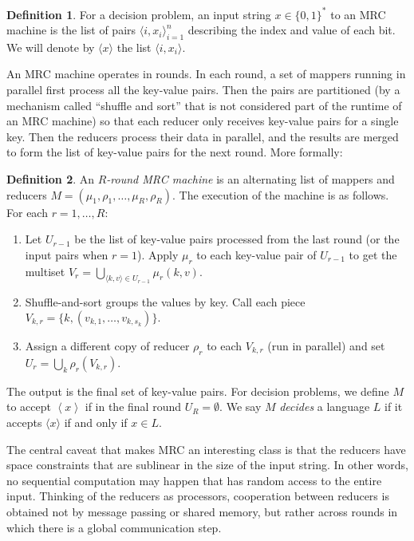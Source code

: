 \documentclass[11pt]{article}
\theoremstyle{definition}
\newtheorem{defn}{Definition}
\theoremstyle{remark}
\begin{document}
\begin{defn}
For a decision problem, an input string $x \in \{ 0,1 \}^*$ to an MRC machine
is the list of pairs $\langle i, x_i \rangle_{i=1}^n$ describing the index
and value of each bit. We will denote by $\langle x \rangle$ the list $\langle
i, x_i \rangle$.
\end{defn}

An MRC machine operates in rounds. In each round, a set of mappers running in
parallel first process all the key-value pairs. Then the pairs are partitioned
(by a mechanism called ``shuffle and sort'' that is not considered part of the
runtime of an MRC machine) so that each reducer only receives key-value pairs
for a single key. Then the reducers process their data in
parallel, and the results are merged to form the list of key-value pairs for
the next round. More formally:

\begin{defn}
An \emph{$R$-round MRC machine} is an alternating list of mappers and reducers
$M = (\mu_1, \rho_1, \dots, \mu_R, \rho_R)$. The execution of the machine is as
follows.
For each $r = 1, \dots, R$:
\begin{enumerate}
  \item Let $U_{r-1}$ be the list of key-value pairs processed from the last
round (or the input pairs when $r=1$). Apply $\mu_r$ to each key-value pair of
$U_{r-1}$ to get the multiset $V_r = \bigcup_{\langle k,v \rangle \in U_{r-1}}
\mu_r(k, v).$

  \item Shuffle-and-sort groups the values by key. Call each piece $V_{k,r} =
\{ k, (v_{k,1}, \dots, v_{k,s_k})\}.$

  \item Assign a different copy of reducer $\rho_r$ to each $V_{k,r}$ (run in
parallel) and set $U_r = \bigcup_{k}\rho_r(V_{k,r})$.
\end{enumerate}
\end{defn}

The output is the final set of key-value pairs. For decision problems, we
define $M$ to accept $\left \langle x \right \rangle$ if in the final round
$U_R = \emptyset$. We say $M$ \emph{decides} a language $L$ if it accepts
$\langle x \rangle$ if and only if $x \in L$.

The central caveat that makes MRC an interesting class is that the reducers
have space constraints that are sublinear in the size of the input string. In
other words, no sequential computation may happen that has random access to the
entire input. Thinking of the reducers as processors, cooperation between
reducers is obtained not by message passing or shared memory, but rather across
rounds in which there is a global communication step.
\end{document}
